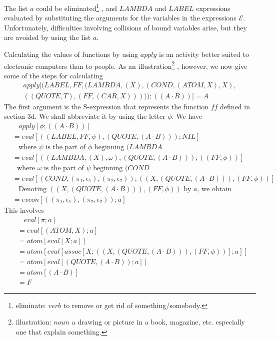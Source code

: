 \documentclass[11pt, a4paper]{article}
\begin{document}
\begin{enumerate}
  The list $a$ could be
  eliminated\footnote{eliminate: $verb$ to remove or get rid of
    something/somebody.}
  , and $LAMBDA$ and $LABEL$ expressions evaluated
  by substituting the arguments for the variables in the expressions
  $\mathcal{E}$. Unfortunately, difficulties involving collisions of bound
  variables arise, but they are avoided by using the list $a$.
\end{enumerate}

Calculating the values of functions by using $apply$ is an activity better
suited to electronic computers than to people. As an
illustration\footnote{illustration: $noun$ a drawing or picture in a book,
  magazine, etc. especially one that explain something.}
, however, we
now give some of the steps for calculating
\begin{align*}
  apply[(LABEL, FF, (LAMBDA, (X), (COND, (ATOM, X), X),\\((QUOTE, T), (FF, (CAR,
    X)))));((A \cdot B))] = A
\end{align*}
The first argument is the S-expression that represents the function $ff$ defined
in section 3d. We shall abbreviate it by using the letter $\phi$. We have
\begin{align*}
  &\ \ \ \ apply[\phi; ((A \cdot B))]                                    \\
  &= eval[((LABEL, FF, \psi), (QUOTE, (A \cdot B))); NIL]                \\
  &\ \ \ \ \text{where $\psi$ is the part of $\phi$ beginning $(LAMBDA$} \\
  &= eval[((LAMBDA, (X), \omega), (QUOTE, (A \cdot B))); ((FF, \phi))]   \\
  &\ \ \ \text{where $\omega$ is the part of $\psi$ beginning $(COND$} \\
  &= eval[(COND, (\pi_1, \epsilon_1), (\pi_2, \epsilon_2)); ((X, (QUOTE, (A
    \cdot B))), (FF, \phi))]                                             \\
  &\ \ \ \ \text{Denoting $((X, (QUOTE, (A \cdot B))), (FF, \phi))$ by $a$, we
    obtain}                                                              \\
  &= evcon[((\pi_1, \epsilon_1), (\pi_2, \epsilon_2)); a]
\end{align*}
This involves
\begin{align*}
  &\ \ \ \ eval[\pi; a]                                               \\
  &= eval[(ATOM, X); a]                                               \\
  &= atom[eval[X; a]]                                                 \\
  &= atom[eval[assoc[X; ((X, (QUOTE, (A \cdot B))), (FF, \phi))]; a]] \\
  &= atom[eval[(QUOTE, (A \cdot B)); a]]                              \\
  &= atom[(A \cdot B)]                                                \\
  &= F
\end{align*}
\end{document}
